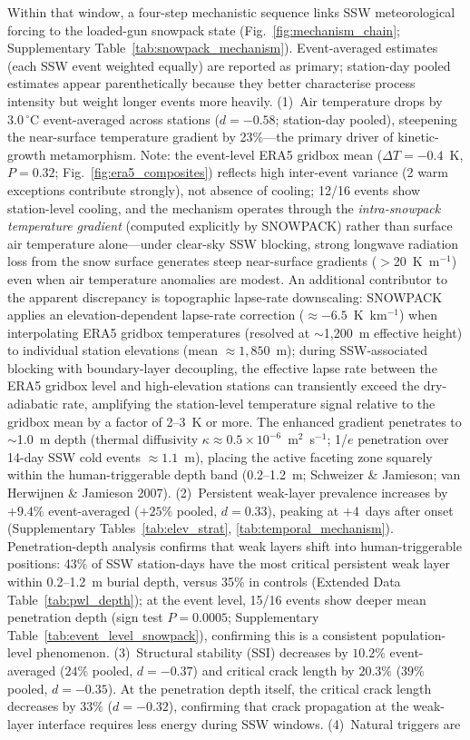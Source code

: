 \documentclass[11pt,letterpaper]{article}
\begin{document}
Within that window, a four-step mechanistic sequence links SSW meteorological forcing to the loaded-gun snowpack state (Fig.~\ref{fig:mechanism_chain}; Supplementary Table~\ref{tab:snowpack_mechanism}). Event-averaged estimates (each SSW event weighted equally) are reported as primary; station-day pooled estimates appear parenthetically because they better characterise process intensity but weight longer events more heavily. (1)~Air temperature drops by $3.0\,^\circ$C event-averaged across stations ($d = -0.58$; station-day pooled), steepening the near-surface temperature gradient by 23\%---the primary driver of kinetic-growth metamorphism\cite{Schweizer2003}. Note: the event-level ERA5 gridbox mean ($\Delta T = -0.4$~K, $P = 0.32$; Fig.~\ref{fig:era5_composites}) reflects high inter-event variance (2 warm exceptions contribute strongly), not absence of cooling; 12/16 events show station-level cooling, and the mechanism operates through the \emph{intra-snowpack temperature gradient} (computed explicitly by SNOWPACK) rather than surface air temperature alone---under clear-sky SSW blocking, strong longwave radiation loss from the snow surface generates steep near-surface gradients ($>$20~K~m$^{-1}$) even when air temperature anomalies are modest. An additional contributor to the apparent discrepancy is topographic lapse-rate downscaling: SNOWPACK applies an elevation-dependent lapse-rate correction ($\approx -6.5$~K~km$^{-1}$) when interpolating ERA5 gridbox temperatures (resolved at $\sim$1,200~m effective height) to individual station elevations (mean $\approx 1,850$~m); during SSW-associated blocking with boundary-layer decoupling, the effective lapse rate between the ERA5 gridbox level and high-elevation stations can transiently exceed the dry-adiabatic rate, amplifying the station-level temperature signal relative to the gridbox mean by a factor of 2--3~K or more. The enhanced gradient penetrates to $\sim$1.0~m depth (thermal diffusivity $\kappa \approx 0.5 \times 10^{-6}$~m$^2$~s$^{-1}$; 1/$e$ penetration over 14-day SSW cold events $\approx 1.1$~m), placing the active faceting zone squarely within the human-triggerable depth band (0.2--1.2~m; Schweizer \& Jamieson\cite{Schweizer2008}; van Herwijnen \& Jamieson 2007). (2)~Persistent weak-layer prevalence increases by $+9.4\%$ event-averaged ($+25\%$ pooled, $d = 0.33$), peaking at $+4$~days after onset (Supplementary Tables~\ref{tab:elev_strat}, \ref{tab:temporal_mechanism}). Penetration-depth analysis confirms that weak layers shift into human-triggerable positions: 43\% of SSW station-days have the most critical persistent weak layer within 0.2--1.2~m burial depth, versus 35\% in controls (Extended Data Table~\ref{tab:pwl_depth}); at the event level, 15/16 events show deeper mean penetration depth (sign test $P = 0.0005$; Supplementary Table~\ref{tab:event_level_snowpack}), confirming this is a consistent population-level phenomenon. (3)~Structural stability (SSI) decreases by $10.2\%$ event-averaged ($24\%$ pooled, $d = -0.37$) and critical crack length by $20.3\%$ ($39\%$ pooled, $d = -0.35$). At the penetration depth itself, the critical crack length decreases by 33\% ($d = -0.32$), confirming that crack propagation at the weak-layer interface requires less energy during SSW windows. (4)~Natural triggers are 
\end{document}
